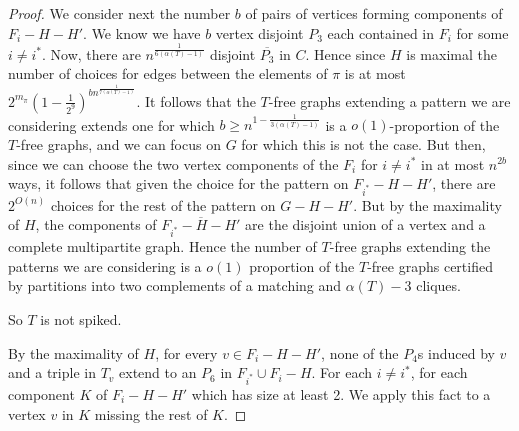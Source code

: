 \documentclass[12pt]{article}
\theoremstyle{definition}
\begin{document}
\begin{proof}
We consider next the  number $b$  of pairs of vertices forming  components of $F_i-H-H'$. We know  we have $b$ vertex disjoint $P_3$ each contained in $F_i$ for some $i \neq i^*$. Now, there are $n^{\frac{1}{6(\alpha(T)-1)}}$
disjoint $\overline {P_3}$ in $C$. Hence since $H$ is maximal the number of choices for edges between the elements of  $\pi$ 
is at most $ 2^{m_\pi}(1-\frac{1}{2^9})^{bn^{\frac{1}{7(\alpha(T)-1)}}}$.
It follows that the $T$-free graphs  extending a pattern we are considering extends one for which $b \ge n^{1-\frac{1}{3(\alpha(T)-1)}}$ 
is a $o(1)$-proportion of the $T$-free graphs, 
and we can focus on $G$ for which this is not  the case.
But then, since we can choose the two vertex components of the $F_i$ for $i \neq i^*$  in at most $n^{2b}$ ways, it follows that given  the choice for the pattern 
on $F_{i^*}-H-H'$, there are $2^{O(n)}$ choices for the rest of the pattern on $G-H-H'$. But by the maximality of $H$,  the components  of $\overline{F_{i^*}-H-H'}$
are the disjoint union of a vertex and a complete multipartite graph. Hence the number of $T$-free graphs extending the patterns we are considering 
is a $o(1)$ proportion of the $T$-free graphs certified by partitions into two complements of a matching and $\alpha(T)-3$ cliques.

So $T$ is not spiked. 

By the maximality of $H$,  for every $v \in F_i-H-H'$, none of the $P_4$s  induced by $v$ and a triple in $T_v$ extend to an  $P_6$ in $F_{i^*} \cup F_i-H$.
For each $i \neq i^*$,  for each component $K$ of $F_i-H-H'$ which has size at least 2. 
We apply  this fact to a vertex  $v$ in $K$ missing the rest of $K$. 



\end{proof}
\end{document}
